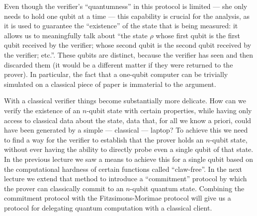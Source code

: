 Even though the verifier's ``quantumness'' in this protocol is limited --- she only needs to hold one qubit at a time --- this capability is crucial for the analysis, as it is used to guarantee the ``existence'' of the state that is being measured: it allows us to meaningfully talk about ``the state $\rho$ whose first qubit is the first qubit received by the verifier; whose second qubit is the second qubit received by the verifier; etc.''. These qubits are distinct, because the verifier has seen and then discarded them (it would be a different matter if they were returned to the prover). In particular, the fact that a one-qubit computer can be trivially simulated on a classical piece of paper is immaterial to the argument.

With a classical verifier things become substantially more delicate. How can we verify the existence of an $n$-qubit state with certain properties, while having only access to classical data about the state, data that, for all we know a priori, could have been generated by a simple --- classical --- laptop? To achieve this we need to find a way for the verifier to establish that the prover holds an $n$-qubit state, without ever having the ability to directly probe even a single qubit of that state. In the previous lecture we saw a means to achieve this for a single qubit based on the computational hardness of certain functions called ``claw-free''. In the next lecture we extend that method to introduce a ``commitment'' protocol by which the prover can classically commit to an $n$-qubit quantum state. Combining the commitment protocol with the Fitzsimons-Morimae protocol will give us a protocol for delegating quantum computation with a classical client. 
